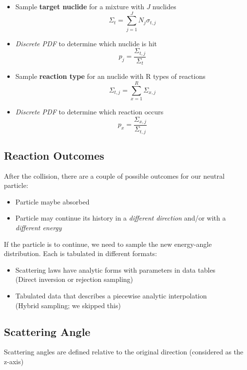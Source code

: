 \documentclass[12pt]{article}
\begin{document}
\begin{itemize}
  \item Sample \textbf{target nuclide} for a mixture with $J$ nuclides
    \[\Sigma_t = \sum_{j=1}^J N_j \sigma_{t,j}\]
  \item \textit{Discrete PDF} to determine which nuclide is hit
    \[p_j = \frac{\Sigma_{t,j}}{\Sigma_t}\]
  \item Sample \textbf{reaction type} for an nuclide with R types of reactions
     \[\Sigma_{t,j} = \sum_{x=1}^R \Sigma_{x,j}\]
  \item \textit{Discrete PDF} to determine which reaction occurs
    \[p_x = \frac{\Sigma_{x,j}}{\Sigma_{t,j}}\]
\end{itemize}

\subsection*{Reaction Outcomes}

After the collision, there are a couple of possible outcomes for our neutral particle:

\begin{itemize}
    \item Particle maybe absorbed
    \item Particle may continue its history in a \textit{different direction} and/or with a \textit{different energy}
\end{itemize}

If the particle is to continue, we need to sample the new energy-angle distribution.  
Each is tabulated in different formats:

\begin{itemize}
  \item Scattering laws have analytic forms with parameters in data tables\\
        (Direct inversion or rejection sampling)
  \item Tabulated data that describes a piecewise analytic interpolation\\
      (Hybrid sampling; we skipped this)
\end{itemize}

\subsection*{Scattering Angle}

Scattering angles are defined relative to the original direction (considered as the z-axis)
\end{document}
